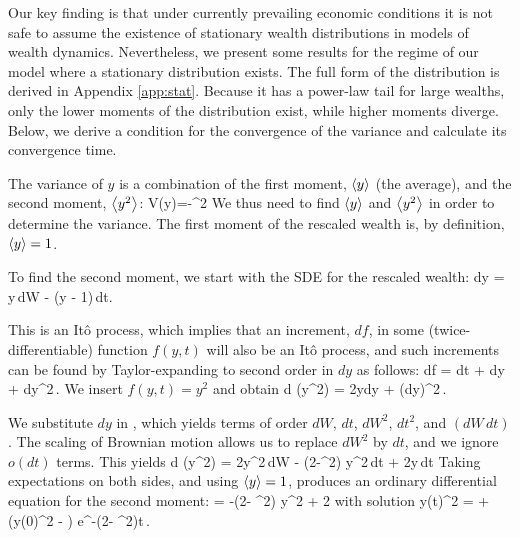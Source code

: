 Our key finding is that under currently prevailing economic conditions it is not safe to assume the existence of stationary wealth distributions in models of wealth dynamics. 
Nevertheless, we present some results for the regime of our model where a stationary distribution exists.
The full form of the distribution is derived in Appendix \ref{app:stat}. Because it has a power-law tail for large wealths, only the lower moments of the distribution exist, while higher moments diverge.
Below, we derive a condition for the convergence of the variance and calculate its convergence time.

The variance of $y$ is a combination of the first moment, $\left\langle y \right\rangle$ (the average), and the second moment, $\left\langle y^2 \right\rangle$:
\be
V\left(y\right)=-^2
\ee
We thus need to find $\left\langle y \right\rangle$ and $\left\langle y^2 \right\rangle$ in order to determine the variance. 
The first moment of the rescaled wealth is, by definition, $\left\langle y \right\rangle=1$. 

To find the second moment, we start with the SDE for the rescaled wealth:
\be
dy = \sigma y\,dW - \tau\left(y - 1\right)\,dt.
\ee

This is an It\^o process, which implies that an increment, $df$, in some (twice-differentiable) function $f\left(y,t\right)$ will also be an It\^o process, and such increments can be found by Taylor-expanding to second order in $dy$ as follows:
\be
df =  dt +  dy +  dy^2\,.
\ee
We insert $f\left(y,t\right)=y^2$ and obtain
\be
d \left(y^2\right) = 2ydy + \left(dy\right)^2\,.
\ee

We substitute $dy$ in , which yields terms of order $dW$, $dt$, $dW^2$, $dt^2$, and $\left(dW\,dt\right)$. The scaling of Brownian motion allows us to replace $dW^2$ by $dt$, and we ignore $o\left(dt\right)$ terms. This yields
\bea
d \left(y^2\right) = 2\sigma y^2\,dW - \left(2\tau-\sigma^2\right) y^2\,dt + 2\tau y\,dt %
\eea
Taking expectations on both sides, and using $\left\langle y \right\rangle=1$, produces an ordinary differential equation for the second moment:
\be
{} = -\left(2\tau - \sigma^2\right) \langle y^2 \rangle + 2\tau
{}
\ee
with solution
\be
\langle y\left(t\right)^2 \rangle =  + \left(\langle y\left(0\right)^2 \rangle - \right) e^{-\left(2\tau - \sigma^2\right)t}\,.
\ee

